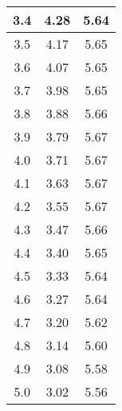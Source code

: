 \begin{tabular}{|c|c|c|}
3.4			& 4.28		& 5.64 \\ \hline
3.5			& 4.17		& 5.65 \\ \hline
3.6			& 4.07		& 5.65 \\ \hline
3.7			& 3.98		& 5.65 \\ \hline
3.8			& 3.88		& 5.66 \\ \hline
3.9			& 3.79		& 5.67 \\ \hline
4.0			& 3.71		& 5.67 \\ \hline
4.1			& 3.63		& 5.67 \\ \hline
4.2			& 3.55		& 5.67 \\ \hline
4.3			& 3.47		& 5.66 \\ \hline
4.4			& 3.40		& 5.65 \\ \hline
4.5			& 3.33		& 5.64 \\ \hline
4.6			& 3.27		& 5.64 \\ \hline
4.7			& 3.20		& 5.62 \\ \hline
4.8			& 3.14		& 5.60 \\ \hline
4.9			& 3.08		& 5.58 \\ \hline
5.0			& 3.02		& 5.56 \\ \hline
\end{tabular}
